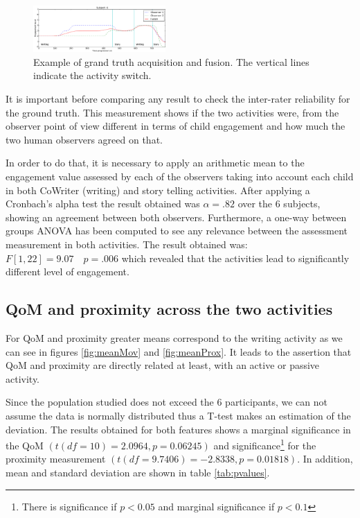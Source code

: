 \documentclass[a4paper, 10pt, conference]{ieeeconf}      %
\begin{document}
\begin{figure}[h!]
        \centering
        \includegraphics[width=0.45\textwidth]{../dissertation/figures/GTexample.png}
        \caption{Example of grand truth acquisition and fusion. The vertical lines indicate the activity switch.}
        \label{fig:GTexample}
\end{figure}

It is important before comparing any result to check the inter-rater reliability for the ground truth. This measurement shows if the two activities were, from the observer point of view different in terms of child engagement and how much the two human observers agreed on that. 

In order to do that, it is necessary to apply an arithmetic mean to the engagement value assessed by each of the observers taking into account each child in both CoWriter (writing) and story telling activities. After applying a Cronbach's alpha test the result obtained was $\alpha = .82$ over the 6 subjects, showing an agreement between both observers. Furthermore, a one-way between groups ANOVA has been computed to see any relevance between the assessment measurement in both activities. The result obtained was: $F[1,22] = 9.07 \quad p=.006$ which revealed that the activities lead to significantly different level of engagement.


\subsection{QoM and proximity across the two activities}
For QoM and proximity greater means correspond to the writing activity as we can see in figures \ref{fig:meanMov} and \ref{fig:meanProx}. It leads to the assertion that QoM and proximity are directly related at least, with an active or passive activity.

Since the population studied does not exceed the 6 participants, we can not assume the data is normally distributed thus a T-test makes an estimation of the deviation. The results obtained for both features shows a marginal significance in the QoM $ (t(df=10)= 2.0964, p = 0.06245) $ and significance\footnote{There is significance if $p<0.05$ and marginal significance if $p<0.1$} for the proximity measurement $(t(df=9.7406)= -2.8338, p = 0.01818) $. In addition, mean and standard deviation are shown in table \ref{tab:pvalues}.
\end{document}
